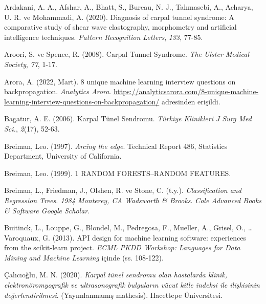 \documentclass[12pt,twoside]{deuthesis}
\begin{document}
\hypertarget{refs}{}
\begin{CSLReferences}
\hspace{0.62cm}\leavevmode{}%
Ardakani, A. A., Afshar, A., Bhatt, S., Bureau, N. J., Tahmasebi, A., Acharya, U. R. ve Mohammadi, A. (2020). Diagnosis of carpal tunnel syndrome: A comparative study of shear wave elastography, morphometry and artificial intelligence techniques. \emph{Pattern Recognition Letters}, \emph{133}, 77-85.

\leavevmode{}%
Aroori, S. ve Spence, R. (2008). Carpal Tunnel Syndrome. \emph{The Ulster Medical Society}, \emph{77}, 1-17.

\leavevmode{}%
Arora, A. (2022, Mart). 8 unique machine learning interview questions on backpropagation. \emph{Analytics Arora}. \url{https://analyticsarora.com/8-unique-machine-learning-interview-questions-on-backpropagation/} adresinden erişildi.

\leavevmode{}%
Bagatur, A. E. (2006). Karpal Tünel Sendromu. \emph{Türkiye Klinikleri J Surg Med Sci.}, \emph{2}(17), 52-63.

\leavevmode{}%
Breiman, Leo. (1997). \emph{Arcing the edge}. Technical Report 486, Statistics Department, University of California.

\leavevmode{}%
Breiman, Leo. (1999). 1 RANDOM FORESTS--RANDOM FEATURES.

\leavevmode{}%
Breiman, L., Friedman, J., Olshen, R. ve Stone, C. (t.y.). \emph{Classification and Regression Trees. 1984 Monterey, CA Wadsworth \& Brooks}. \emph{Cole Advanced Books \& Software Google Scholar}.

\leavevmode{}%
Buitinck, L., Louppe, G., Blondel, M., Pedregosa, F., Mueller, A., Grisel, O., \ldots{} Varoquaux, G. (2013). {API} design for machine learning software: experiences from the scikit-learn project. \emph{ECML PKDD Workshop: Languages for Data Mining and Machine Learning} içinde (ss. 108-122).

\leavevmode{}%
Çalıcıoğlu, M. N. (2020). \emph{Karpal tünel sendromu olan hastalarda klinik, elektronöromyografik ve ultrasonografik bulguların vücut kitle indeksi ile ilişkisinin değerlendirilmesi}. (Yayımlanmamış mathesis). Hacettepe Üniversitesi.


\end{CSLReferences}
\end{document}
